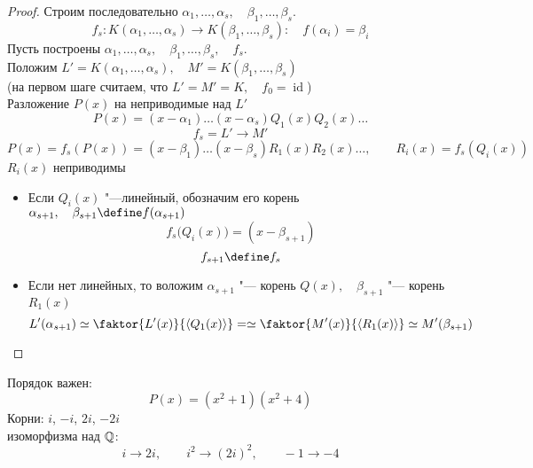\begin{proof}
	Строим последовательно $ \alpha_1, \dots, \alpha_s, \quad \beta_1, \dots, \beta_s $.
	$$ f_s : K(\alpha_1, \dots, \alpha_s) \to K(\beta_1, \dots, \beta_s) : \quad f(\alpha_i) = \beta_i $$
	Пусть построены $ \alpha_1, \dots, \alpha_s, \quad \beta_1, \dots, \beta_s, \quad f_s $. \\
	Положим $ L' = K(\alpha_1, \dots, \alpha_s), \quad M' = K(\beta_1, \dots, \beta_s) $ \\
	(на первом шаге считаем, что $ L' = M' = K, \quad f_0 = \operatorname{id} $) \\
	Разложение $ P(x) $ на неприводимые над $ L' $
	$$ P(x) = (x - \alpha_1)\dots(x - \alpha_s) Q_1(x)Q_2(x)\dots $$
	$$ f_s = L' \to M' $$
	$$ P(x) = f_s(P(x)) = (x - \beta_1)\dots(x - \beta_s)R_1(x)R_2(x)\dots, \qquad R_i(x) = f_s(Q_i(x)) $$
	$ R_i(x) $ неприводимы
	\begin{itemize}
		\item Если $ Q_i(x) $ "---линейный, обозначим его корень $ \alpha_{s + 1}, \quad \beta_{s + 1} \define f(\alpha_{s + 1}) $
		$$ f_s \big( Q_i(x) \big) = (x - \beta_{s + 1}) $$
		$$ f_{s + 1} \define f_s $$
		\item Если нет линейных, то воложим $ \alpha_{s + 1} $ "--- корень $ Q(x), \quad \beta_{s + 1} $ "--- корень $ R_1(x) $
		$$ L'(\alpha_{s + 1}) \simeq \faktor{L'(x)}{\braket{Q_1(x)}} = \simeq \faktor{M'(x)}{\braket{R_1(x)}} \simeq M'(\beta_{s + 1}) $$
	\end{itemize}
\end{proof}

\begin{remark}
	Порядок важен:
	$$ P(x) = (x^2 + 1)(x^2 + 4) $$
	Корни: $ i $, $ -i $, $ 2i $, $ -2i $ \\
	 изоморфизма над $ \mathbb{Q} $:
	$$ i \to 2i, \qquad i^2 \to (2i)^2, \qquad -1 \to -4 $$
\end{remark}
